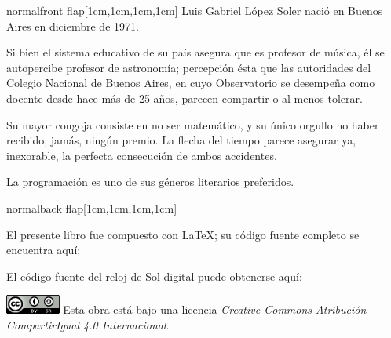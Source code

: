 \documentclass[coverwidth=148mm, coverheight=210mm, spinewidth=37mm,
flapwidth=7cm, wrapwidth=3mm, 11pt]{bookcover}
\begin{document}
\begin{bookcover}
\begin{bookcoverelement}{normal}{front flap}[1cm,1cm,1cm,1cm]
    \color{black} Luis Gabriel López Soler nació en Buenos Aires en
    diciembre de 1971.

    \hspace{.5em} Si bien el sistema educativo de su país asegura que
    es profesor de música, él se autopercibe profesor de astronomía;
    percepción ésta que las autoridades del Colegio Nacional de Buenos
    Aires, en cuyo Observatorio se desempeña como docente desde hace
    más de 25 años, parecen compartir o al menos tolerar.

    \hspace{.5em} Su mayor congoja consiste en no ser
    matemático, y su único orgullo no haber recibido, jamás, ningún
    premio. La flecha del tiempo parece asegurar ya, inexorable, la
    perfecta consecución de ambos accidentes.

    \hspace{.5em} La programación es uno de sus géneros literarios
    preferidos.

  \end{bookcoverelement}

  \begin{bookcoverelement}{normal}{back flap}[1cm,1cm,1cm,1cm]

        El presente libro fue compuesto con \LaTeX; su código fuente
    completo se encuentra aquí:

    \begin{center}
      \colorbox{white}{%
        }
    \end{center}

    \bigskip
    
    El código fuente del reloj de Sol digital puede obtenerse aquí:

    \begin{center}
      \colorbox{white}{%
        }
    \end{center}

    
    \vfill


    \includegraphics[height=1.7em]{../cc-88x31} Esta obra está ba\-jo una
    licencia \emph{Creative Commons Atribución-CompartirIgual 4.0
      Internacional}.

    \begin{center}
      \colorbox{white}{%
        }
    \end{center}



\end{bookcoverelement}
\end{bookcover}
\end{document}
